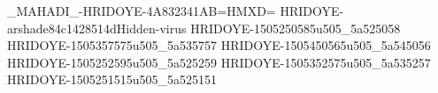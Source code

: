 _MAHADI_-HRIDOYE-4A832341AB=HMXD=
HRIDOYE-arshade84c1428514dHidden-virus
HRIDOYE-1505250585u505_5a525058
HRIDOYE-1505357575u505_5a535757
HRIDOYE-1505450565u505_5a545056
HRIDOYE-1505252595u505_5a525259
HRIDOYE-1505352575u505_5a535257
HRIDOYE-1505251515u505_5a525151
